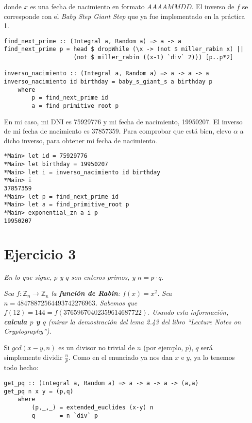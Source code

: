 \documentclass[10pt,spanish]{article}
\begin{document}
donde $x$ es una fecha de nacimiento en formato $AAAAMMDD$. El inverso de $f$ se corresponde con el \textit{\textcolor{azul}{Baby Step Giant Step}} que ya fue implementado en la práctica 1.

\begin{verbatim}
find_next_prime :: (Integral a, Random a) => a -> a
find_next_prime p = head $ dropWhile (\x -> (not $ miller_rabin x) || 
                    (not $ miller_rabin ((x-1) `div` 2))) [p..p*2]

inverso_nacimiento :: (Integral a, Random a) => a -> a -> a
inverso_nacimiento id birthday = baby_s_giant_s a birthday p
    where
        p = find_next_prime id
        a = find_primitive_root p
\end{verbatim}

En mi caso, mi DNI es 75929776 y mi fecha de nacimiento, 19950207. El inverso de mi fecha de nacimiento es 37857359. Para comprobar que está bien, elevo $\alpha$ a dicho inverso, para obtener mi fecha de nacimiento.

\begin{verbatim}
*Main> let id = 75929776
*Main> let birthday = 19950207
*Main> let i = inverso_nacimiento id birthday
*Main> i
37857359
*Main> let p = find_next_prime id
*Main> let a = find_primitive_root p
*Main> exponential_zn a i p
19950207
\end{verbatim}

\section{\textcolor{azul}Ejercicio 3}
\textit{En lo que sigue, $p$ y $q$ son enteros primos, y $n = p \cdot q$.}

\textit{Sea $f: \mathbb{Z}_n \rightarrow \mathbb{Z}_n$ la \textbf{\textcolor{azul}{función de Rabin}}: $f(x) = x^2$. Sea $n = 48478872564493742276963$. Sabemos que $f(12) = 144= f(37659670402359614687722)$. Usando esta información, \textbf{\textcolor{azul}{calcula $p$ y $q$}} (mirar la demostración del lema 2.43 del libro ``Lecture Notes on Cryptography'').}

Si $gcd(x-y,n)$ es un divisor no trivial de $n$ (por ejemplo, $p$), $q$ será simplemente dividir $\frac{n}{p}$. Como en el enunciado ya nos dan $x$ e $y$, ya lo tenemos todo hecho:

\begin{verbatim}
get_pq :: (Integral a, Random a) => a -> a -> a -> (a,a)
get_pq n x y = (p,q)
    where
        (p,_,_) = extended_euclides (x-y) n
        q       = n `div` p
\end{verbatim}
\end{document}
